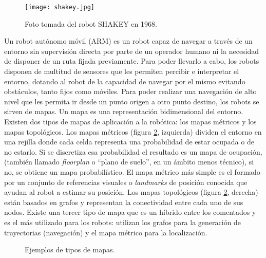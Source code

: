 \begin{figure}[h]
	\begin{center} 
	\texttt{[image: shakey.jpg]}
	\end{center}
	\caption{Foto tomada del robot SHAKEY en 1968. \cite{shakey2}}
	\label{fig:shakey}
\end{figure}


Un robot autónomo móvil (ARM) es un robot capaz de navegar a través de un entorno sin supervisión directa por parte de un operador humano ni la necesidad de disponer de un ruta fijada previamente. Para poder llevarlo a cabo, los robots disponen de multitud de sensores que les permiten percibir e interpretar el entorno, dotando al robot de la capacidad de navegar por el mismo evitando obstáculos, tanto fijos como móviles. Para poder realizar una navegación de alto nivel que les permita ir desde un punto origen a otro punto destino, los robots se sirven de mapas. Un mapa es una representación bidimensional del entorno. Existen dos tipos de mapas de aplicación a la robótica: los mapas métricos y los mapas topológicos. Los mapas métricos (figura \ref{fig:mapas}, izquierda) dividen el entorno en una rejilla donde cada celda representa una probabilidad de estar ocupada o de no estarlo. Si se discretiza esa probabilidad el resultado es un mapa de ocupación, (también llamado \textit{floorplan} o ``plano de suelo'', en un ámbito menos técnico), si no, se obtiene un mapa probabilístico. El mapa métrico más simple es el formado por un conjunto de referencias visuales o \textit{landmarks} de posición conocida que ayudan al robot a estimar su posición. Los mapas topológicos (figura \ref{fig:mapas}, derecha) están basados en grafos y representan la conectividad entre cada uno de sus nodos. Existe una tercer tipo de mapa que es un híbrido entre los comentados y es el más utilizado para los robots: utilizan los grafos para la generación de trayectorias (navegación) y el mapa métrico para la localización.\\

\begin{figure}[H]
 \centering
  \hspace{2cm}
 \caption{Ejemplos de tipos de mapas.}
 \label{fig:mapas}
\end{figure}

